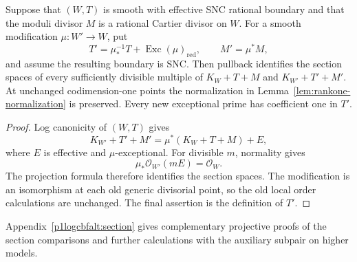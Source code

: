 \begin{lemma}
\label{lem:normalized-models}
Suppose that $(W,T)$ is smooth with effective SNC rational boundary and
that the moduli divisor $M$ is a rational Cartier divisor on $W$.
For a smooth modification $\mu:W'\to W$, put
\[
 T'=\mu_*^{-1}T+\operatorname{Exc}(\mu)_{\mathrm{red}},
 \qquad M'=\mu^*M,
\]
and assume the resulting boundary is SNC. Then pullback identifies the
section spaces of every sufficiently divisible multiple of
$K_W+T+M$ and $K_{W'}+T'+M'$. At unchanged codimension-one points the
normalization in Lemma~\ref{lem:rankone-normalization} is preserved.
Every new exceptional prime has coefficient one in $T'$.
\end{lemma}

\begin{proof}
Log canonicity of $(W,T)$ gives
\[
 K_{W'}+T'+M'=\mu^*(K_W+T+M)+E,
\]
where $E$ is effective and $\mu$-exceptional. For divisible $m$,
normality gives
\[
 \mu_*\mathcal O_{W'}(mE)=\mathcal O_W.
\]
The projection formula therefore identifies the section spaces.
The modification is an isomorphism at each old generic divisorial
point, so the old local order calculations are unchanged. The final
assertion is the definition of $T'$.
\end{proof}

Appendix~\ref{p1logcbfalt:section} gives complementary projective
proofs of the section comparisons and further calculations with the
auxiliary subpair on higher models.
